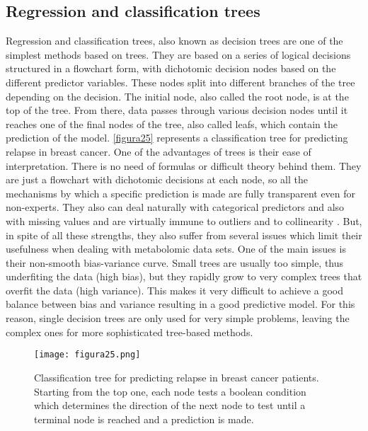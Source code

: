 \subsection{Regression and classification trees}
\label{decisiontrees}
Regression and classification trees, also known as decision trees are one of the simplest methods based on trees. They are based on a series of logical decisions structured in a flowchart form, with dichotomic decision nodes based on the different predictor variables. These nodes split into different branches of the tree depending on the decision. The initial node, also called the root node, is at the top of the tree. From there, data passes through various decision nodes until it reaches one of the final nodes of the tree, also called leafs, which contain the prediction of the model. \autoref{figura25} represents a classification tree for predicting relapse in breast cancer. One of the advantages of trees is their ease of interpretation. There is no need of formulas or difficult theory behind them. They are just a flowchart with dichotomic decisions at each node, so all the mechanisms by which a specific prediction is made are fully transparent even for non-experts. They also can deal naturally with categorical predictors and also with missing values and are virtually immune to outliers \parencite{venables2002tree} and to collinearity \parencite{loh2014fifty}. But, in spite of all these strengths, they also suffer from several issues which limit their usefulness when dealing with metabolomic data sets. One of the main issues is their non-smooth bias-variance curve. Small trees are usually too simple, thus underfiting the data (high bias), but they rapidly grow to very complex trees that overfit the data (high variance). This makes it very difficult to achieve a good balance between bias and variance resulting in a good predictive model. For this reason, single decision trees are only used for very simple problems, leaving the complex ones for more sophisticated tree-based methods.

\begin{figure}[hbtp]
\centering
\texttt{[image: figura25.png]}
\caption{Classification tree for predicting relapse in breast cancer patients. Starting from the top one, each node tests a boolean condition which determines the direction of the next node to test until a terminal node is reached and a prediction is made.}
\label{figura25}
\end{figure}

